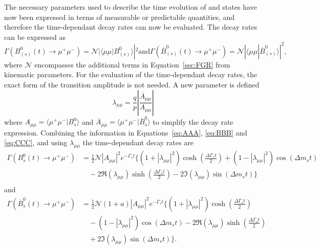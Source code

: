 The necessary parameters used to describe the time evolution of \bsd and \barbsd states have now been expressed in terms of measurable or predictable quantities, and therefore the time-dependant decay rates can now be evaluated. The decay rates can be expressed as
\begin{equation}
\Gamma (B^0_{(s)}(t) \to \mu^+ \mu^-) = \mathcal{N}|\langle \mu \mu | B^0_{(s)} \rangle|^2 \mathrm{  and  }
\Gamma (\overline{B}^0_{(s)}(t) \to \mu^+ \mu^-) =\mathcal{N}|\langle \mu\mu | \overline{B}^0_{(s)} \rangle|^{2},
\label{eq:CCC}
\end{equation}
where $\mathcal{N}$ encompasses the additional terms in Equation~\ref{sec:FGR} from kinematic parameters. For the evaluation of the time-dependant decay rates, the exact form of the transition amplitude is not needed. A new parameter is defined
\begin{equation}
\lambda_{\mu\mu} = \frac{q}{p} \left| \frac{\overline{A}_{\mu\mu}}{A_{\mu\mu}}\right|
\end{equation}
where $A_{\mu\mu} = \langle \mu^+\mu^- | B^0_s \rangle$ and $\overline{A}_{\mu\mu} = \langle \mu^+\mu^- |\overline{B}^0_s \rangle$ to simplify the decay rate expression. Combining the information in Equations~\ref{eq:AAA}, \ref{eq:BBB} and \ref{eq:CCC}, and using $\lambda_{\mu\mu}$ the time-dependant decay rates are
\begin{align}
\Gamma(B^0_s(t) \to \mu^+ \mu^-) &=  \frac{1}{2} \mathcal{N} |A_{\mu\mu}|^2 e^{- \Gamma_s t} \bigg\{ (1 + |\lambda_{\mu\mu}|^2) \cosh \left( \frac{\Delta \Gamma_s t}{2} \right) + ( 1 - |\lambda_{\mu\mu}|^2) \cos(\Delta m_s t) \nonumber \\
& \quad {}- 2\mathrm{\Re}(\lambda_{\mu\mu})\sinh \left(\frac{\Delta \Gamma_s t}{2}\right) - 2\mathrm{\Im}(\lambda_{\mu\mu})\sin(\Delta m_s t) \bigg\} \label{eq:decayratesApart} \\
\end{align}
and
\begin{align}
\Gamma(\overline{B}^0_s(t) \to \mu^+ \mu^-) &=  \frac{1}{2} \mathcal{N} (1 + a)|A_{\mu\mu}|^2 e^{- \Gamma_s t} \bigg\{ (1 + |\lambda_{\mu\mu}|^2) \cosh \left( \frac{\Delta \Gamma_s t}{2} \right) \nonumber \\
& \quad {}- ( 1 - |\lambda_{\mu\mu}|^2) \cos(\Delta m_s t) -2\mathrm{\Re}(\lambda_{\mu\mu})\sinh \left(\frac{\Delta \Gamma_s t}{2}\right) \nonumber\\ 
& \quad {}+ 2\mathrm{\Im}(\lambda_{\mu\mu})\sin(\Delta m_s t) \bigg\}. \label{eq:decayratesA}
\end{align}
